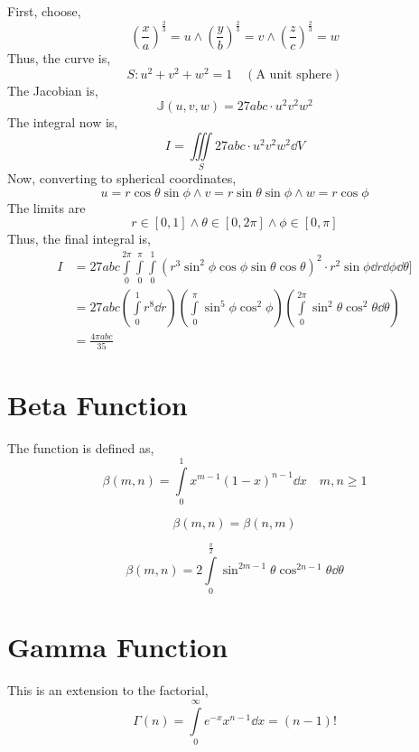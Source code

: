 \begin{explanation}
	First, choose,
	\[\left(\frac{x}{a}\right)^\frac{2}{3}=u\land \left(\frac{y}{b}\right)^\frac{2}{3}=v\land \left(\frac{z}{c}\right)^\frac{2}{3}=w\]
	Thus, the curve is,
	\[S:u^2+v^2+w^2=1\quad(\text{A unit sphere})\]
	The Jacobian is,
	\[\mathbb{J}(u,v,w)=27abc\cdot u^2v^2w^2\]
	The integral now is,
	\[I=\iiint\limits_S 27abc\cdot u^2v^2w^2 \dd{V}\]
	Now, converting to spherical coordinates,
	\[u=r\cos\theta\sin\phi\land v=r\sin\theta\sin\phi\land w=r\cos\phi\]
	The limits are
	\[r\in[0,1]\land \theta\in[0,2\pi]\land \phi\in[0,\pi]\]
	Thus, the final integral is,
	\[\begin{split}
		I&=27abc\int\limits_0^{2\pi}\int\limits_0^\pi\int\limits_0^1 (r^3\sin^2\phi\cos\phi\sin\theta\cos\theta)^2\cdot r^2\sin\phi\dd{r}\dd{\phi}\dd{\theta}]\\
		&=27abc\left( \int\limits_0^1 r^8\dd{r} \right)\left(\int\limits_0^\pi \sin^5\phi\cos^2\phi\right)\left(\int\limits_0^{2\pi} \sin^2\theta\cos^2\theta\dd{\theta}\right)\\
		&=\frac{4\pi abc}{35}
	\end{split}\]
\end{explanation}
\section{Beta Function}
The function is defined as,
\[\beta(m,n)=\int\limits_0^1x^{m-1}(1-x)^{n-1}\dd{x}\quad m,n\geq 1\]
\begin{theorem}[Symmetry]
	\[\beta(m,n)=\beta(n,m)\]
\end{theorem}
\begin{theorem}
	\[\beta(m,n)=2\int\limits_0^\frac{\pi}{2}\sin^{2m-1}\theta \cos^{2n-1}\theta\dd{\theta}\]
\end{theorem}
\section{Gamma Function}
This is an extension to the factorial,
\[\Gamma(n)=\int\limits_0^\infty e^{-x}x^{n-1}\dd{x}=(n-1)!\]

